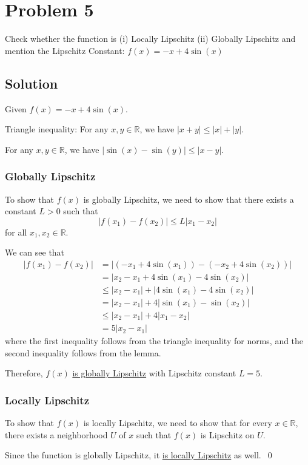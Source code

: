 \section*{Problem 5}

Check whether the function is
(i) Locally Lipschitz
(ii) Globally Lipschitz
and mention the Lipschitz Constant:
\( f (x) = -x + 4\sin(x) \)

\subsection*{Solution}

Given \( f(x) = -x + 4\sin(x) \).

\begin{lemma}{Triangle inequality:}
    For any \( x, y \in \mathbb{R} \), we have \( \lvert x + y \rvert \leq \lvert x \rvert + \lvert y \rvert \).
\end{lemma}

\begin{lemma}
    For any \( x, y \in \mathbb{R} \), we have \( \lvert \sin(x) - \sin(y) \rvert \leq \lvert x - y \rvert \).
\end{lemma}

\subsubsection*{Globally Lipschitz}

To show that \( f(x) \) is globally Lipschitz, we need to show that there exists a constant \( L > 0 \) such that
\[
    \lvert f(x_1) - f(x_2) \rvert \leq L \lvert x_1 - x_2 \rvert
\]
for all \( x_1, x_2 \in \mathbb{R} \).

We can see that
\begin{align*}
    \lvert f(x_1) - f(x_2) \rvert
     & =
    \lvert (-x_1 + 4\sin(x_1)) - (-x_2 + 4\sin(x_2)) \rvert
    \\ & =
    \lvert x_2 - x_1 + 4\sin(x_1) - 4\sin(x_2) \rvert
    \\ & \leq
    \lvert x_2 - x_1 \rvert + \lvert 4\sin(x_1) - 4\sin(x_2) \rvert
    \\ & =
    \lvert x_2 - x_1 \rvert + 4 \lvert \sin(x_1) - \sin(x_2) \rvert
    \\ & \leq
    \lvert x_2 - x_1 \rvert + 4 \lvert x_1 - x_2 \rvert
    \\ & = 5 \lvert x_2 - x_1 \rvert
\end{align*}
where the first inequality follows from the triangle inequality for norms, and the second inequality follows from the lemma.

Therefore, \( f(x) \) \underline{is globally Lipschitz} with Lipschitz constant \( L = 5 \).

\subsubsection*{Locally Lipschitz}

To show that \( f(x) \) is locally Lipschitz, we need to show that for every \( x \in \mathbb{R} \), there exists a neighborhood \( U \) of \( x \) such that \( f(x) \) is Lipschitz on \( U \).

Since the function is globally Lipschitz, it \underline{is locally Lipschitz} as well.~\qed

